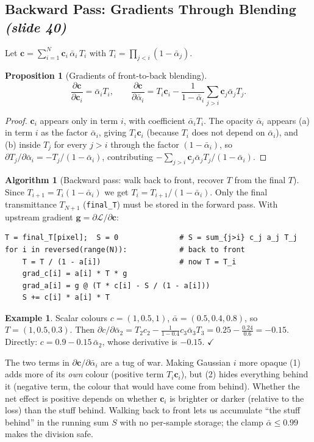 \documentclass[11pt,a4paper]{article}
\newcommand{\sr}[1]{\texorpdfstring{\emph{(#1)}}{(#1)}}
\newcommand{\Lc}{\mathcal{L}}
\newcommand{\abar}{\bar\alpha}
\theoremstyle{definition}
\newtheorem{example}[definition]{Example}
\newtheorem{algorithm}{Algorithm}[section]
\theoremstyle{plain}
\newtheorem{proposition}[definition]{Proposition}
\theoremstyle{remark}
\begin{document}
\subsection{Backward Pass: Gradients Through Blending \sr{slide 40}}
Let $\bm c=\sum_{i=1}^N\bm c_i\,\abar_i\,T_i$ with $T_i=\prod_{j<i}(1-\abar_j)$.

\begin{proposition}[Gradients of front-to-back blending]\label{prop:bwd}
\[
\frac{\partial\bm c}{\partial\bm c_i}=\abar_iT_i,\qquad
\frac{\partial\bm c}{\partial\abar_i}=T_i\bm c_i-\frac{1}{1-\abar_i}\sum_{j>i}\bm c_j\abar_jT_j .
\]
\end{proposition}
\begin{proof}
$\bm c_i$ appears only in term $i$, with coefficient $\abar_iT_i$. The opacity $\abar_i$ appears (a) in term $i$ as the factor $\abar_i$, giving $T_i\bm c_i$ (because $T_i$ does not depend on $\abar_i$), and (b) inside $T_j$ for every $j>i$ through the factor $(1-\abar_i)$, so $\partial T_j/\partial\abar_i=-T_j/(1-\abar_i)$, contributing $-\sum_{j>i}\bm c_j\abar_jT_j/(1-\abar_i)$.
\end{proof}

\begin{algorithm}[Backward pass: walk back to front, recover $T$ from the final $T$]\label{alg:bwd}
Since $T_{i+1}=T_i(1-\abar_i)$ we get $T_i=T_{i+1}/(1-\abar_i)$. Only the final transmittance $T_{N+1}$ (\texttt{final\_T}) must be stored in the forward pass. With upstream gradient $\bm g=\partial\Lc/\partial\bm c$:
\begin{lstlisting}
T = final_T[pixel];  S = 0              # S = sum_{j>i} c_j a_j T_j
for i in reversed(range(N)):            # back to front
    T = T / (1 - a[i])                  # now T = T_i
    grad_c[i] = a[i] * T * g
    grad_a[i] = g @ (T * c[i] - S / (1 - a[i]))
    S += c[i] * a[i] * T
\end{lstlisting}
\end{algorithm}

\begin{example}
Scalar colours $c=(1,0.5,1)$, $\abar=(0.5,0.4,0.8)$, so $T=(1,0.5,0.3)$. Then $\partial c/\partial\abar_2=T_2c_2-\frac1{1-0.4}c_3\abar_3T_3=0.25-\frac{0.24}{0.6}=-0.15$. Directly: $c=0.9-0.15\,\abar_2$, whose derivative is $-0.15$. $\checkmark$
\end{example}

\begin{intuition}
The two terms in $\partial\bm c/\partial\abar_i$ are a tug of war. Making Gaussian $i$ more opaque (1) adds more of its \emph{own} colour (positive term $T_i\bm c_i$), but (2) hides everything behind it (negative term, the colour that would have come from behind). Whether the net effect is positive depends on whether $\bm c_i$ is brighter or darker (relative to the loss) than the stuff behind. Walking back to front lets us accumulate ``the stuff behind'' in the running sum $S$ with no per-sample storage; the clamp $\abar\le0.99$ makes the division safe.
\end{intuition}
\end{document}
